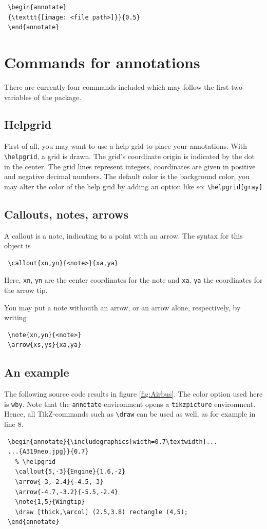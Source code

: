 \documentclass[a4paper,11pt]{article}
\begin{document}
\begin{lstlisting}
 \begin{annotate}
 {\texttt{[image: <file path>]}}{0.5}
 \end{annotate}
\end{lstlisting}

\section{Commands for annotations}
There are currently four commands included which may follow the first two variables of the package.

\subsection{Helpgrid}
First of all, you may want to use a help grid to place your annotations. With \texttt{\textbackslash helpgrid}, a grid is drawn. The grid's coordinate origin is indicated by the dot in the center. The grid lines represent integers, coordinates are given in positive and negative decimal numbers. The default color is the background color, you may alter the color of the help grid by adding an option like so: \texttt{\textbackslash helpgrid[gray]}

\subsection{Callouts, notes, arrows }
A callout is a note, indicating to a point with an arrow. The syntax for this object is
\begin{lstlisting}
 \callout{xn,yn}{<note>}{xa,ya}
\end{lstlisting}
Here, \texttt{xn}, \texttt{yn} are the center coordinates for the note and \texttt{xa}, \texttt{ya} the coordinates for the arrow tip.

You may put a note withouth an arrow, or an arrow alone, respectively, by writing
\begin{lstlisting}
 \note{xn,yn}{<note>}
 \arrow{xs,ys}{xa,ya}
\end{lstlisting}

\newpage
\subsection{An example}
The following source code results in figure \ref{fig:Airbus}. The color option used here is \texttt{wby}. Note that the \texttt{annotate}-environment opens a \texttt{tikzpicture} environment. Hence, all TikZ-commands such as \texttt{\textbackslash draw} can be used as well, as for example in line 8.
\begin{lstlisting}
 \begin{annotate}{\includegraphics[width=0.7\textwidth]...
 ...{A319neo.jpg}}{0.7}
   % \helpgrid
   \callout{5,-3}{Engine}{1.6,-2}
   \arrow{-3,-2.4}{-4.5,-3}
   \arrow{-4.7,-3.2}{-5.5,-2.4}
   \note{1,5}{Wingtip}
   \draw [thick,\arcol] (2.5,3.8) rectangle (4,5);
 \end{annotate}
\end{lstlisting}
\end{document}

